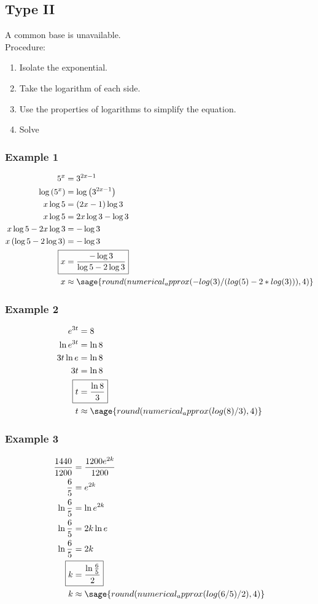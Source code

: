 \documentclass{amsart}
\begin{document}
\begin{footnotesize}
\begin{multicols}{4}
\columnbreak
\subsection*{Type II}
A common base is unavailable. \\
Procedure:
\begin{enumerate}
\item Isolate the exponential.
\item Take the logarithm of each side.
\item Use the properties of logarithms to simplify the equation.
\item Solve
\end{enumerate}
\subsubsection*{Example 1}
\begin{align*}
5^x&=3^{2x-1}\\
\log\left(5^x\right)&=\log\left(3^{2x-1}\right)\\
x\log 5&=\left(2x-1\right)\log 3\\
x\log 5&=2x\log 3-\log 3\\
x\log 5-2x\log 3&=-\log 3\\
x\left(\log 5-2\log 3\right)&=-\log 3\\
\Aboxed{x&=\frac{-\log 3}{\log 5-2\log 3}}\\
x&\approx\sage{round(numerical_approx(-log(3)/(log(5)-2*log(3))),4)}
\end{align*}
\subsubsection*{Example 2}
\begin{align*}
e^{3t}&=8\\
\ln e^{3t}&=\ln 8\\
3t\ln e&=\ln 8\\
3t&=\ln 8\\
\Aboxed{t&=\frac{\ln 8}{3}}\\
t&\approx\sage{round(numerical_approx(log(8)/3),4)}
\end{align*}
\subsubsection*{Example 3}
\begin{align*}
\frac{1440}{1200}&=\frac{1200e^{2k}} {1200}\\
{\frac{6}{5}}&={e^{2k}}\\
\ln{\frac{6}{5}}&=\ln{e^{2k}}\\
\ln{\frac{6}{5}}&=2k\ln{e}\\
\ln{\frac{6}{5}}&=2k\\
\Aboxed{k &= \frac{\ln\frac{6}{5}}{2}} \\
k&\approx\sage{round(numerical_approx(log(6/5)/2),4)}
\end{align*}


\end{multicols}
\end{footnotesize}
\end{document}
